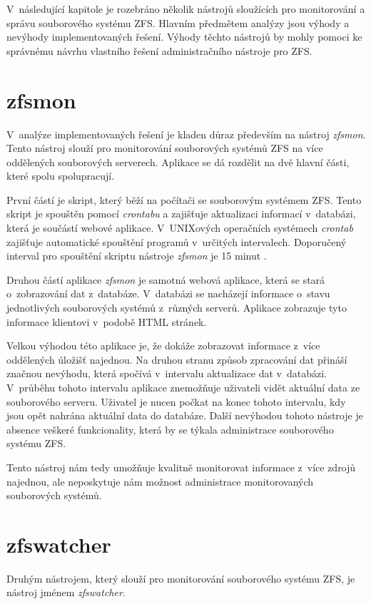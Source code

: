 V~následující kapitole je rozebráno několik nástrojů sloužících pro monitorování a správu souborového systému ZFS. Hlavním předmětem analýzy jsou výhody a nevýhody implementovaných řešení. Výhody těchto nástrojů by mohly pomoci ke správnému návrhu vlastního řešení administračního nástroje pro ZFS.
\section{zfsmon}
V~analýze implementovaných řešení je kladen důraz především na nástroj \emph{zfsmon}. Tento nástroj slouží pro monitorování souborových systémů ZFS na více oddělených souborových serverech. Aplikace se dá rozdělit na dvě hlavní části, které spolu spolupracují.

První částí je skript, který běží na počítači se souborovým systémem ZFS. Tento skript je spouštěn pomocí \emph{crontabu} a zajišťuje aktualizaci informací v~databázi, která je součástí webové aplikace. V~UNIXových operačních systémech \emph{crontab} zajišťuje automatické spouštění programů v~určitých intervalech. Doporučený interval pro spouštění skriptu nástroje \emph{zfsmon} je 15 minut \cite{zfsmon}.

Druhou částí aplikace \emph{zfsmon} je samotná webová aplikace, která se stará o~zobrazování dat z~databáze. V~databázi se nacházejí informace o~stavu jednotlivých souborových systémů z~různých serverů. Aplikace zobrazuje tyto informace klientovi v~podobě HTML stránek.

Velkou výhodou této aplikace je, že dokáže zobrazovat informace z~více oddělených úložišť najednou. Na druhou stranu způsob zpracování dat přináší značnou nevýhodu, která spočívá v~intervalu aktualizace dat v~databázi. V~průběhu tohoto intervalu aplikace znemožňuje uživateli vidět aktuální data ze souborového serveru. Uživatel je nucen počkat na konec tohoto intervalu, kdy jsou opět nahrána aktuální data do databáze. Další nevýhodou tohoto nástroje je absence veškeré funkcionality, která by se týkala administrace souborového systému ZFS.

Tento nástroj nám tedy umožňuje kvalitně monitorovat informace z~více zdrojů najednou, ale neposkytuje nám možnost administrace monitorovaných souborových systémů.
\section{zfswatcher}
Druhým nástrojem, který slouží pro monitorování souborového systému ZFS, je nástroj jménem \emph{zfswatcher}.

